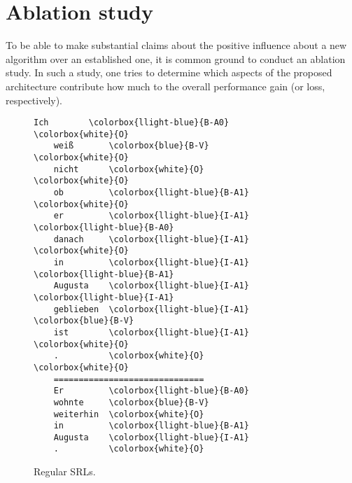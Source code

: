 {%








\section{Ablation study}
\label{sec:ablation}

To be able to make substantial claims about the positive influence about a new algorithm over an
established one, it is common ground to conduct an ablation study. In such a study, one tries to
determine which aspects of the proposed architecture contribute how much to the overall performance
gain (or loss, respectively).

\begin{wrapfigure}[17]{r}{0pt}
\begin{minipage}{0.45\linewidth}
  \centering
    \begin{srl}
      \begin{BVerbatim}[commandchars=\\\{\}, fontsize=\footnotesize]
    Ich        \colorbox{llight-blue}{B-A0}         \colorbox{white}{O}
    weiß       \colorbox{blue}{B-V}          \colorbox{white}{O}
    nicht      \colorbox{white}{O}            \colorbox{white}{O}
    ob         \colorbox{llight-blue}{B-A1}         \colorbox{white}{O}
    er         \colorbox{llight-blue}{I-A1}         \colorbox{llight-blue}{B-A0}
    danach     \colorbox{llight-blue}{I-A1}         \colorbox{white}{O}
    in         \colorbox{llight-blue}{I-A1}         \colorbox{llight-blue}{B-A1}
    Augusta    \colorbox{llight-blue}{I-A1}         \colorbox{llight-blue}{I-A1}
    geblieben  \colorbox{llight-blue}{I-A1}         \colorbox{blue}{B-V}
    ist        \colorbox{llight-blue}{I-A1}         \colorbox{white}{O}
    .          \colorbox{white}{O}            \colorbox{white}{O}
    ==============================
    Er         \colorbox{llight-blue}{B-A0}
    wohnte     \colorbox{blue}{B-V}
    weiterhin  \colorbox{white}{O}
    in         \colorbox{llight-blue}{B-A1}
    Augusta    \colorbox{llight-blue}{I-A1}
    .          \colorbox{white}{O}
      \end{BVerbatim}
      \caption{Regular SRLs.}
      \label{srl:normal}
    \end{srl}
\end{minipage}
\end{wrapfigure}

}
